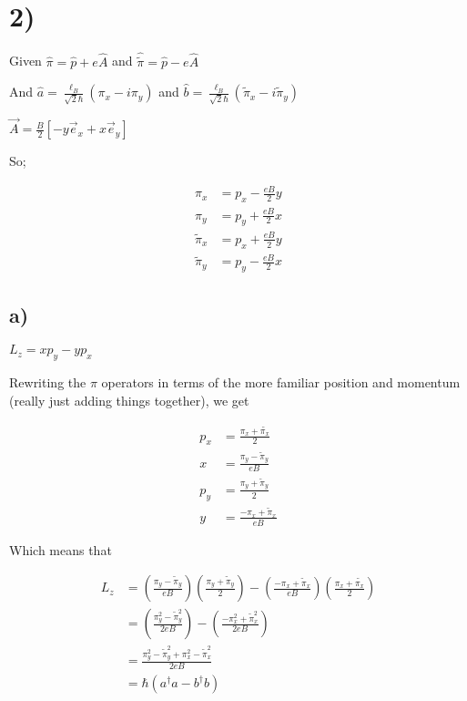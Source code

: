 \documentclass{article}
\newcommand{\p}[1]{\left(#1\right)}
\begin{document}
\section*{2)}
Given $\hat{\pi}=\hat{p}+e\hat{A}$ and $\hat{\tilde{\pi}}=\hat{p}-e\hat{A}$

And $\hat{a}=\frac{\ell_B}{\sqrt{2}\hbar}\p{\pi_x-i\pi_y}$ and $\hat{b}=\frac{\ell_B}{\sqrt{2}\hbar}\p{\tilde{\pi}_x-i\tilde{\pi}_y}$

$\vec{A}=\frac{B}{2}[-y\vec{e}_x+x\vec{e}_y]$

So;

\begin{align*}
    \pi_x&=p_x-\frac{eB}{2}y\\[1em]
    \pi_y&=p_y+\frac{eB}{2}x\\[1em]
    \tilde{\pi}_x&=p_x+\frac{eB}{2}y\\[1em]
    \tilde{\pi}_y&=p_y-\frac{eB}{2}x
\end{align*}

\subsection*{a)}

$L_z=xp_y-yp_x$

Rewriting the $\pi$ operators in terms of the more familiar position and momentum (really just adding things together), we get

\begin{align*}
    p_x&=\frac{\pi_x+\tilde{{\pi}_x}}{2}\\[1em]
    x&=\frac{\pi_y-\tilde{\pi}_y}{eB}\\[1em]
    p_y&=\frac{\pi_y+\tilde{\pi}_y}{2}\\[1em]
    y&=\frac{-\pi_x+\tilde{\pi}_x}{eB}
\end{align*}

Which means that

\begin{align*}
    L_z&=\p{\frac{\pi_y-\tilde{\pi}_y}{eB}}\p{\frac{\pi_y+\tilde{\pi}_y}{2}}-\p{\frac{-\pi_x+\tilde{\pi}_x}{eB}}\p{\frac{\pi_x+\tilde{{\pi}_x}}{2}}\\[1em]
    &=\p{\frac{\pi_y^2-\tilde{\pi}_y^2}{2eB}}-\p{\frac{-\pi_x^2+\tilde{\pi}_x^2}{2eB}}\\[1em]
    &=\frac{\pi_y^2-\tilde{\pi}_y^2+\pi_x^2-\tilde{\pi}_x^2}{2eB}\\[1em]
    &=\hbar\p{a^{\dagger}a-b^{\dagger}b}
\end{align*}
\end{document}
